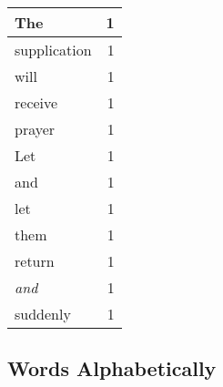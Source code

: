 \begin{center}
\begin{longtable}{l|r}
The & 1 \\ \hline
supplication & 1 \\ \hline
will & 1 \\ \hline
receive & 1 \\ \hline
prayer & 1 \\ \hline
Let & 1 \\ \hline
and & 1 \\ \hline
let & 1 \\ \hline
them & 1 \\ \hline
return & 1 \\ \hline
\emph{and} & 1 \\ \hline
suddenly & 1 \\ \hline
\end{longtable}
\end{center}



\normalsize



\subsection{Words Alphabetically}

